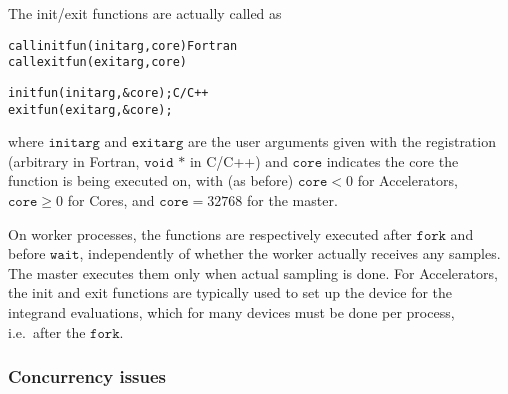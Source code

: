 \documentclass[12pt]{article}
\newcommand\ie{i.e.\ }
\newcommand\Code[1]{\ensuremath{\texttt{#1}}}
\begin{document}
The init/exit functions are actually called as
\begin{alltt}
   call initfun(initarg, core)               \textrm{Fortran}
   call exitfun(exitarg, core)
\end{alltt}
\begin{alltt}
   initfun(initarg, &core);                  \textrm{C/C++}
   exitfun(exitarg, &core);
\end{alltt}
where \Code{initarg} and \Code{exitarg} are the user arguments given 
with the registration (arbitrary in Fortran, \Code{void *} in C/C++) 
and \Code{core} indicates the core the function is being executed on, 
with (as before) $\Code{core} < 0$ for Accelerators, 
$\Code{core}\geqslant 0$ for Cores, and $\Code{core} = 32768$ for the 
master.

On worker processes, the functions are respectively executed after 
\Code{fork} and before \Code{wait}, independently of whether the worker 
actually receives any samples.  The master executes them only when 
actual sampling is done.
For Accelerators, the init and exit functions are typically used to set 
up the device for the integrand evaluations, which for many devices must 
be done per process, \ie after the \Code{fork}.


\subsubsection{Concurrency issues}
\end{document}

